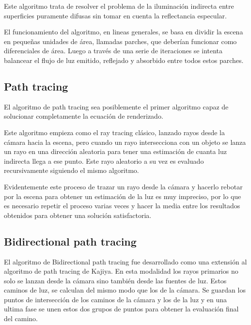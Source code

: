 \medskip

Este algoritmo trata de resolver el problema de la iluminación indirecta entre superficies puramente difusas sin tomar en cuenta la reflectancia especular.

\medskip

El funcionamiento del algoritmo, en lineas generales, se basa en dividir la escena en pequeñas unidades de área, llamadas parches, que deberían funcionar como diferenciales de área. Luego a través de una serie de iteraciones se intenta balancear el flujo de luz emitido, reflejado y absorbido entre todos estos parches.

\clearpage

\subsection{Path tracing}

El algoritmo de path tracing \cite{Kajiya1986} sea posiblemente el primer algoritmo capaz de solucionar completamente la ecuación de renderizado.

\medskip

Este algoritmo empieza como el ray tracing clásico, lanzado rayos desde la cámara hacia la escena, pero cuando un rayo intersecciona con un objeto se lanza un rayo en una dirección aleatoria para tener una estimación de cuanta luz indirecta llega a ese punto. Este rayo aleatorio a su vez es evaluado recursivamente siguiendo el mismo algoritmo. 

\medskip 

Evidentemente este proceso de trazar un rayo desde la cámara y hacerlo rebotar por la escena para obtener un estimación de la luz es muy impreciso, por lo que es necesario repetir el proceso varias veces y hacer la media entre los resultados obtenidos para obtener  una solución satisfactoria. 

\subsection{Bidirectional path tracing}

El algoritmo de Bidirectional path tracing \cite{Lafortune1993} fue desarrollado como una extensión al algoritmo de path tracing de Kajiya. En esta modalidad los rayos primarios no solo se lanzan desde la cámara sino también desde las fuentes de luz. Estos caminos de luz, se calculan del mismo modo que los de la cámara. Se guardan los puntos de intersección de los caminos de la cámara y los de la luz y en una ultima fase se unen estos dos grupos de puntos para obtener la evaluación final del camino.

